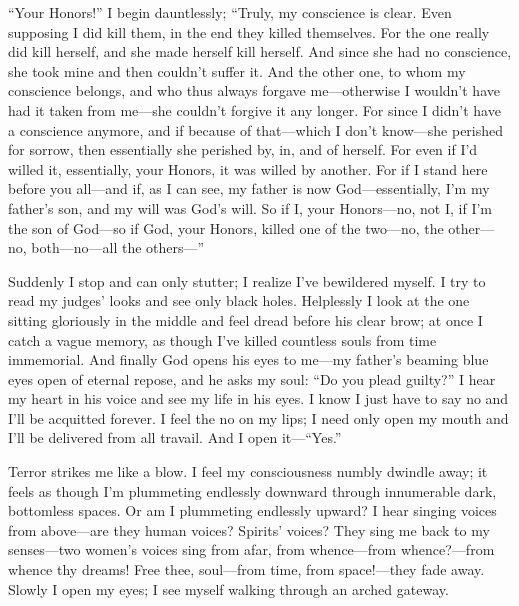 \documentclass[12pt,a4paper]{article}
\begin{document}
“Your Honors!” I begin dauntlessly; “Truly, my conscience is clear. Even supposing I did kill them, in the end they killed themselves. For the one really did kill herself, and she made herself kill herself. And since she had no conscience, she took mine and then couldn’t suffer it. And the other one, to whom my conscience belongs, and who thus always forgave me—otherwise I wouldn’t have had it taken from me—she couldn’t forgive it any longer. For since I didn’t have a conscience anymore, and if because of that—which I don’t know—she perished for sorrow, then essentially she perished by, in, and of herself. For even if I’d willed it, essentially, your Honors, it was willed by another. For if I stand here before you all—and if, as I can see, my father is now God—essentially, I’m my father’s son, and my will was God’s will. So if I, your Honors—no, not I, if I’m the son of God—so if God, your Honors, killed one of the two—no, the other—no, both—no—all the others—”

Suddenly I stop and can only stutter; I realize I’ve bewildered myself. I try to read my judges’ looks and see only black holes. Helplessly I look at the one sitting gloriously in the middle and feel dread before his clear brow; at once I catch a vague memory, as though I’ve killed countless souls from time immemorial. And finally God opens his eyes to me—my father’s beaming blue eyes open of eternal repose, and he asks my soul: “Do you plead guilty?” I hear my heart in his voice and see my life in his eyes. I know I just have to say no and I’ll be acquitted forever. I feel the no on my lips; I need only open my mouth and I’ll be delivered from all travail. And I open it—“Yes.”

Terror strikes me like a blow. I feel my consciousness numbly dwindle away; it feels as though I’m plummeting endlessly downward through innumerable dark, bottomless spaces. Or am I plummeting endlessly upward? I hear singing voices from above—are they human voices? Spirits’ voices? They sing me back to my senses—two women’s voices sing from afar, from whence—from whence?—from whence thy dreams! Free thee, soul—from time, from space!—they fade away. Slowly I open my eyes; I see myself walking through an arched gateway.
\end{document}
